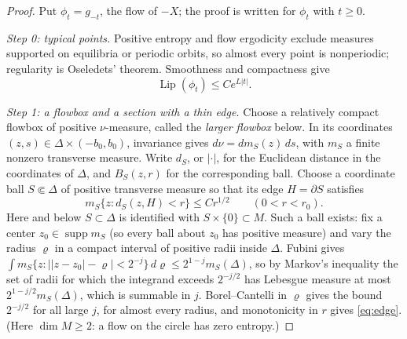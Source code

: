\documentclass[12pt]{article}
\theoremstyle{remark}
\newcommand{\supp}{\operatorname{supp}}
\newcommand{\Lip}{\operatorname{Lip}}
\begin{document}
\begin{proof}
Put \(\phi_t=g_{-t}\), the flow of \(-X\); the proof is written for
\(\phi_t\) with \(t\ge0\).

\emph{Step 0: typical points.}
Positive entropy and flow ergodicity exclude measures supported on
equilibria or periodic orbits, so almost every point is
nonperiodic; regularity is Oseledets' theorem.  Smoothness and
compactness give
\begin{equation}\label{eq:global-lip}
 \Lip(\phi_t)\le C e^{L|t|}.
\end{equation}

\emph{Step 1: a flowbox and a section with a thin edge.}
Choose a relatively compact flowbox of positive \(\nu\)-measure,
called the \emph{larger flowbox} below.
In its coordinates \((z,s)\in \Delta\times(-b_0,b_0)\), invariance gives
\(d\nu=dm_S(z)\,ds\), with \(m_S\) a finite nonzero transverse
measure.  Write \(d_S\), or \(|\cdot|\), for the Euclidean distance
in the coordinates of \(\Delta\), and \(B_S(z,r)\) for the
corresponding ball.  Choose a coordinate ball \(S\Subset \Delta\) of
positive transverse measure so that its edge \(H=\partial S\)
satisfies
\begin{equation}\label{eq:edge}
 m_S\{z:d_S(z,H)<r\}\le C r^{1/2}\qquad(0<r<r_0).
\end{equation}
Here and below \(S\subset\Delta\) is identified with
\(S\times\{0\}\subset M\).
Such a ball exists: fix a center \(z_0\in\supp m_S\) (so every ball
about \(z_0\) has positive measure) and vary the
radius \(\varrho\) in a compact interval of positive radii inside
\(\Delta\).  Fubini gives
\(\int m_S\{z:|\lvert z-z_0\rvert-\varrho|<2^{-j}\}\,d\varrho
 \le 2^{1-j}m_S(\Delta)\),
so by Markov's inequality the set of radii for which the
integrand exceeds \(2^{-j/2}\) has Lebesgue measure at most
\(2^{1-j/2}m_S(\Delta)\), which is summable in \(j\).
Borel--Cantelli in \(\varrho\) gives the bound
\(2^{-j/2}\) for all large \(j\), for almost every radius, and
monotonicity in \(r\) gives \eqref{eq:edge}.
(Here \(\dim M\ge2\): a flow on the circle has zero entropy.)


\end{proof}
\end{document}
